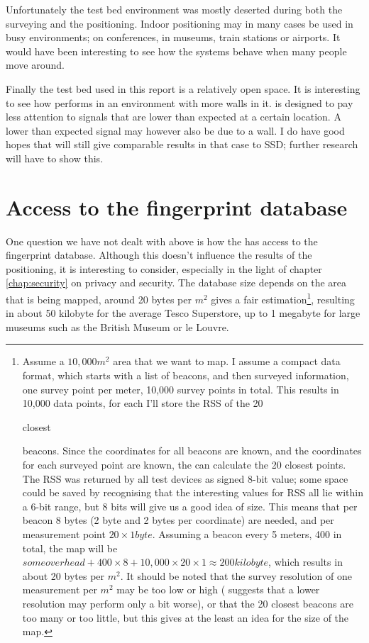Unfortunately the test bed environment was mostly deserted during both the surveying and the positioning.
Indoor positioning may in many cases be used in busy environments; on conferences, in museums, train stations or airports.
It would have been interesting to see how the systems behave when many people move around.

Finally the test bed used in this report is a relatively open space.
It is interesting to see how \aBRP performs in an environment with more walls in it.
\aBRP is designed to pay less attention to signals that are lower than expected at a certain location.
A lower than expected signal may however also be due to a wall.
I do have good hopes that \aBRP will still give comparable results in that case to SSD; further research will have to show this.

\section{Access to the fingerprint database}
\label{architecture-database}
One question we have not dealt with above is how the \device has access to the fingerprint database.
Although this doesn't influence the results of the positioning, it is interesting to consider, especially in the light of chapter \ref{chap:security} on privacy and security.
The database size depends on the area that is being mapped, around 20 bytes per $m^2$ gives a fair estimation\footnote{Assume a $10,000m^2$ area that we want to map.
    I assume a compact data format, which starts with a list of beacons, and then surveyed information, one survey point per meter, 10,000 survey points in total.
    This results in 10,000 data points, for each I'll store the RSS of the 20 \begin{em}closest\end{em} beacons.
    Since the coordinates for all beacons are known, and the coordinates for each surveyed point are known, the \device can calculate the 20 closest points.
    The RSS was returned by all test devices as signed 8-bit value; some space could be saved by recognising that the interesting values for RSS all lie within a 6-bit range, but 8 bits will give us a good idea of size.
    This means that per beacon 8 bytes (2 byte \bid and 2 bytes per coordinate) are needed, and per measurement point $20 \times 1 byte$.
    Assuming a beacon every 5 meters, 400 in total, the map will be $some overhead + 400 \times 8 + 10,000 \times 20 \times 1 \approx 200 kilobyte$, which results in about 20 bytes per $m^2$.
    It should be noted that the survey resolution of one measurement per $m^2$ may be too low or high (\citet{bahl2000radar} suggests that a lower resolution may perform only a bit worse), or that the 20 closest beacons are too many or too little, but this gives at the least an idea for the size of the map.
}, resulting in about 50 kilobyte for the average Tesco Superstore, up to 1 megabyte for large museums such as the British Museum or le Louvre.

